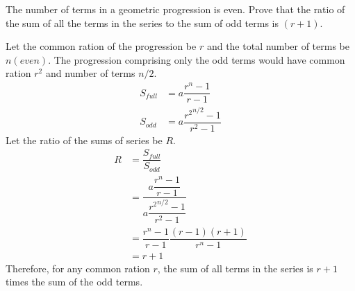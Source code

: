 
\question[4] The number of terms in a geometric progression is even. Prove that the ratio of the sum of all the terms in the series to the sum of odd terms is $(r+1)$.


\ifprintanswers
\fi 

\begin{solution}[\halfpage]
  Let the common ration of the progression be $r$ and the total number of terms be $n(even)$. The progression comprising only the odd terms would have common ration $r^2$ and number of terms $n/2$. \\
  \begin{align}
    S_{full} &= a\dfrac{r^n-1}{r-1} \\
    S_{odd}  &= a\dfrac{{r^2}^{n/2}-1}{r^2-1}
  \end{align}
  Let the ratio of the sums of series be $R$.
  \begin{align}
    R &= \dfrac{S_{full}}{S_{odd}} \\
      &= \dfrac{a\dfrac{r^n-1}{r-1}}{a\dfrac{{r^2}^{n/2}-1}{r^2-1}} \\
      &= \dfrac{r^n-1}{r-1}\dfrac{(r-1)(r+1)}{r^n-1} \\
      &= r + 1
  \end{align}
  Therefore, for any common ration $r$, the sum of all terms in the series is $r+1$ times the sum of the odd terms.
\end{solution}
